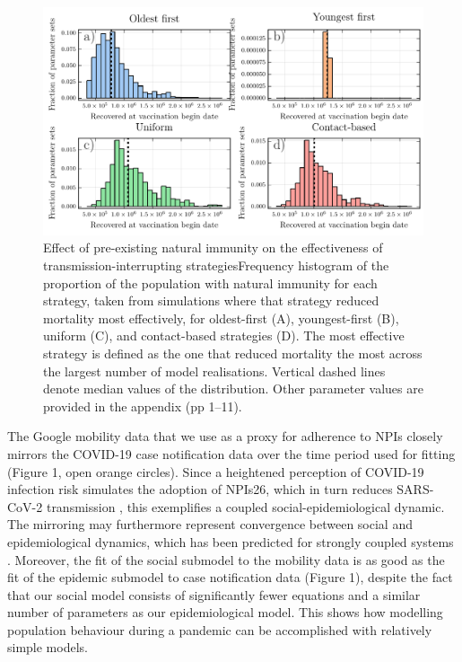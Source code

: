 \begin{figure}
  \includegraphics[width=\textwidth]{chapter_3/histograms.pdf}  
\caption{Effect of pre-existing natural immunity on the effectiveness of transmission-interrupting strategiesFrequency histogram of the proportion of the population with natural immunity for each strategy, taken from simulations where that strategy reduced mortality most effectively, for oldest-first (A), youngest-first (B), uniform (C), and contact-based strategies (D). The most effective strategy is defined as the one that reduced mortality the most across the largest number of model realisations. Vertical dashed lines denote median values of the distribution. Other parameter values are provided in the appendix (pp 1–11).}
\label{fig6}
\end{figure}
The Google mobility data that we use as a proxy for adherence to NPIs closely mirrors the COVID-19 case notification data over the time period used for fitting (Figure 1, open orange circles).  Since a heightened perception of COVID-19 infection risk simulates the adoption of NPIs26, which in turn reduces SARS-CoV-2 transmission \cite{anderson2020estimating,peak2020individual}, this exemplifies a coupled  social-epidemiological dynamic.  The mirroring may furthermore represent convergence between social and epidemiological dynamics, which has been predicted for strongly coupled systems \cite{sigdel2019convergence}. Moreover, the fit of the social submodel to the mobility data is as good as the fit of the epidemic submodel to case notification data (Figure 1), despite the fact that our social model consists of significantly fewer equations and a similar number of parameters as our epidemiological model. This shows how modelling population behaviour during a pandemic can be accomplished with relatively simple models. 

